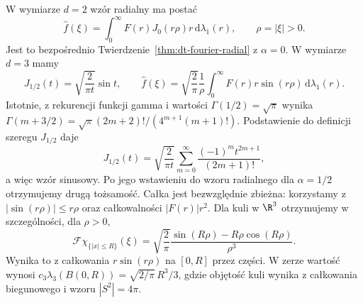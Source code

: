 \begin{przyklad}
\label{ex:dt-radial-two-three}
W wymiarze $d=2$ wzór radialny ma postać
\[
 \widehat f(\xi)=\int_0^\infty F(r)J_0(r\rho)r\,
 \mathrm d\lambda_1(r),\qquad \rho=|\xi|>0.
\]
Jest to bezpośrednio Twierdzenie~\ref{thm:dt-fourier-radial}
z $\alpha=0$.
W wymiarze $d=3$ mamy
\[
 J_{1/2}(t)=\sqrt{\frac{2}{\pi t}}\sin t,\qquad
 \widehat f(\xi)=\sqrt{\frac{2}{\pi}}\frac1\rho
 \int_0^\infty F(r)r\sin(r\rho)\,\mathrm d\lambda_1(r).
\]
Istotnie, z rekurencji funkcji gamma i wartości
$\Gamma(1/2)=\sqrt\pi$ wynika
$\Gamma(m+3/2)=\sqrt\pi(2m+2)!/(4^{m+1}(m+1)!)$.
Podstawienie do definicji szeregu $J_{1/2}$ daje
\[
 J_{1/2}(t)=\sqrt{\frac2{\pi t}}
 \sum_{m=0}^\infty\frac{(-1)^m t^{2m+1}}{(2m+1)!},
\]
a więc wzór sinusowy. Po jego wstawieniu do wzoru
radialnego dla $\alpha=1/2$ otrzymujemy drugą tożsamość.
Całka jest bezwzględnie zbieżna: korzystamy z
$|\sin(r\rho)|\le r\rho$ oraz całkowalności
$|F(r)|r^2$.
Dla kuli w $\R^3$ otrzymujemy w szczególności, dla $\rho>0$,
\[
 \mathcal F\chi_{\{|x|\le R\}}(\xi)
 =\sqrt{\frac2\pi}
 \frac{\sin(R\rho)-R\rho\cos(R\rho)}{\rho^3}.
\]
Wynika to z całkowania $r\sin(r\rho)$ na $[0,R]$
przez części. W zerze wartość wynosi
$c_3\lambda_3(B(0,R))=\sqrt{2/\pi}\,R^3/3$,
gdzie objętość kuli wynika z całkowania biegunowego
i wzoru $|S^2|=4\pi$.
\end{przyklad}

